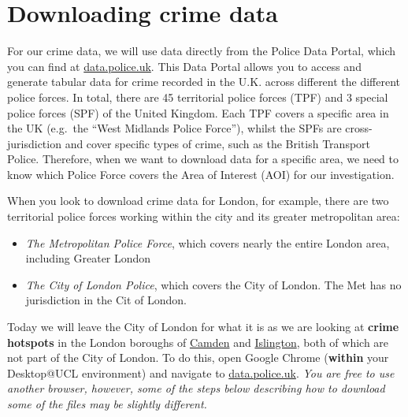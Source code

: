 \documentclass[
]{book}
\providecommand{\tightlist}{%
  \setlength{\itemsep}{0pt}\setlength{\parskip}{0pt}}
\begin{document}
\hypertarget{downloading-crime-data}{%
\section*{Downloading crime data}\label{downloading-crime-data}}

For our crime data, we will use data directly from the Police Data Portal, which you can find at \href{https://data.police.uk/}{data.police.uk}. This Data Portal allows you to access and generate tabular data for crime recorded in the U.K. across different the different police forces. In total, there are 45 territorial police forces (TPF) and 3 special police forces (SPF) of the United Kingdom. Each TPF covers a specific area in the UK (e.g.~the ``West Midlands Police Force''), whilst the SPFs are cross-jurisdiction and cover specific types of crime, such as the British Transport Police. Therefore, when we want to download data for a specific area, we need to know which Police Force covers the Area of Interest (AOI) for our investigation.

When you look to download crime data for London, for example, there are two territorial police forces working within the city and its greater metropolitan area:

\begin{itemize}
\tightlist
\item
  \emph{The Metropolitan Police Force}, which covers nearly the entire London area, including Greater London
\item
  \emph{The City of London Police}, which covers the City of London. The Met has no jurisdiction in the Cit of London.
\end{itemize}

Today we will leave the City of London for what it is as we are looking at \textbf{crime hotspots} in the London boroughs of \href{https://www.google.com/maps/place/London+Borough+of+Camden,+London/@51.5428102,-0.1944449,13z/data=!3m1!4b1!4m5!3m4!1s0x48761aec186b9a3d:0x41185c626be66e0!8m2!3d51.5454736!4d-0.1627902?hl=en}{Camden} and \href{https://www.google.com/maps/place/London+Borough+of+Islington,+London/@51.5470193,-0.1444663,13z/data=!3m1!4b1!4m5!3m4!1s0x48761b5dedeb3be5:0x54f085cb18ec65c9!8m2!3d51.5465063!4d-0.1058058?hl=en}{Islington}, both of which are not part of the City of London. To do this, open Google Chrome (\textbf{within} your Desktop@UCL environment) and navigate to \href{https://data.police.uk/}{data.police.uk}. \emph{You are free to use another browser, however, some of the steps below describing how to download some of the files may be slightly different.}
\end{document}
